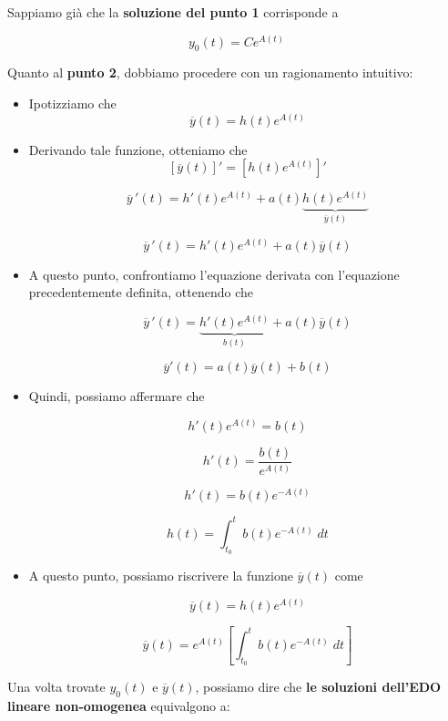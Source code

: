 \documentclass[a4paper, 12pt]{report}
\begin{document}
    Sappiamo già che la \textbf{soluzione del punto 1} corrisponde a
    
    \[ y_0(t) = Ce^{A(t)}\]
    
    Quanto al \textbf{punto 2}, dobbiamo procedere con un ragionamento intuitivo:
    
    \begin{itemize}
        \item Ipotizziamo che 
        \[ \overline{y} (t) = h(t) e^{A(t)}\]
        
        \item Derivando tale funzione, otteniamo che
        \[ [\overline{y} (t)]' = [h(t) e^{A(t)}]'\]
        
        \[ \overline{y} \, ' (t) = h'(t) e^{A(t)}+a(t)\underbrace{h(t)e^{A(t)}}_{\overline{y}(t)}\]
        
        \[ \overline{y} \,'(t) =  h'(t) e^{A(t)}+ a(t) \overline{y}(t)\]
        
        \item A questo punto, confrontiamo l'equazione derivata con l'equazione precedentemente definita, ottenendo che
        
        \[ \overline{y} \,'(t) =  \underbrace{h'(t) e^{A(t)}}_{b(t)}+ a(t) \overline{y}(t)\]
        
        \[ \overline{y}'(t) = a(t)\overline{y}(t)+b(t) \]
        
        \item Quindi, possiamo affermare che
        
        \[ h'(t) e^{A(t)} = b(t)\]
        
        \[ h'(t) = \frac{b(t)}{e^{A(t)}}\]
        
        \[ h'(t) = b(t)e^{-A(t)}\]
        
        \[ h(t) = \int_{t_0}^{t} b(t)e^{-A(t)} \; dt\]
        
        \item A questo punto, possiamo riscrivere la funzione $\overline{y}(t)$ come
        
        \[ \overline{y}(t) = h(t)e^{A(t)}\]
        
        \[ \overline{y}(t) = e^{A(t)} \left [ \int_{t_0}^{t} b(t)e^{-A(t)} \; dt \right ]\]
        
    \end{itemize}
    
    Una volta trovate $y_0(t)$ e $\overline{y}(t)$, possiamo dire che \textbf{le soluzioni dell'EDO lineare non-omogenea} equivalgono a:
    
\end{document}

